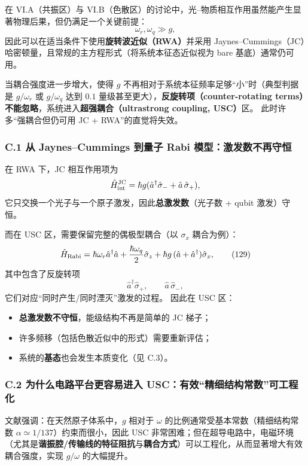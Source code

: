 \documentclass[12pt,a4paper,oneside]{ctexbook}
\begin{document}
在 VI.A（共振区）与 VI.B（色散区）的讨论中，光--物质相互作用虽然能产生显著物理后果，但仍满足一个关键前提：
\[
\omega_r,\omega_q \gg g,
\]
因此可以在适当条件下使用\textbf{旋转波近似（RWA）}并采用 Jaynes--Cummings（JC）哈密顿量，且常规的主方程形式（将系统本征态近似视为 bare 基底）通常仍可用。

当耦合强度进一步增大，使得 $g$ 不再相对于系统本征频率足够“小”时（典型判据是 $g/\omega_r$ 或 $g/\omega_q$ 达到 $0.1$ 量级甚至更大），\textbf{反旋转项（counter-rotating terms）不能忽略}，系统进入\textbf{超强耦合（ultrastrong coupling, USC）}区。
此时许多“强耦合但仍可用 JC + RWA”的直觉将失效。

\subsubsection{C.1 从 Jaynes--Cummings 到量子 Rabi 模型：激发数不再守恒}

在 RWA 下，JC 相互作用项为
\[
\hat H_{\rm int}^{\rm JC}=\hbar g(\hat a^\dagger \hat\sigma_-+\hat a\,\hat\sigma_+),
\]
它只交换一个光子与一个原子激发，因此\textbf{总激发数}（光子数 + qubit 激发）守恒。

而在 USC 区，需要保留完整的偶极型耦合（以 $\sigma_x$ 耦合为例）：
\begin{equation}
\hat H_{\rm Rabi}
=
\hbar\omega_r \hat a^\dagger\hat a
+\frac{\hbar\omega_q}{2}\hat\sigma_z
+\hbar g\,(\hat a+\hat a^\dagger)\hat\sigma_x,
\tag{129}
\end{equation}
其中包含了反旋转项
\[
\hat a^\dagger \hat\sigma_+,\qquad \hat a\,\hat\sigma_-,
\]
它们对应“同时产生/同时湮灭”激发的过程。
因此在 USC 区：
\begin{itemize}
  \item \textbf{总激发数不守恒}，能级结构不再是简单的 JC 梯子；
  \item 许多频移（包括色散近似中的形式）需要重新评估；
  \item 系统的\textbf{基态}也会发生本质变化（见 C.3）。
\end{itemize}

\subsubsection{C.2 为什么电路平台更容易进入 USC：有效“精细结构常数”可工程化}

文献强调：在天然原子体系中，$g$ 相对于 $\omega$ 的比例通常受基本常数（精细结构常数 $\alpha\simeq 1/137$）约束而很小，因此 USC 非常困难；但在超导电路中，电磁环境（尤其是\textbf{谐振腔/传输线的特征阻抗}与\textbf{耦合方式}）可以工程化，从而显著增大有效耦合强度，实现 $g/\omega$ 的大幅提升。
\end{document}
